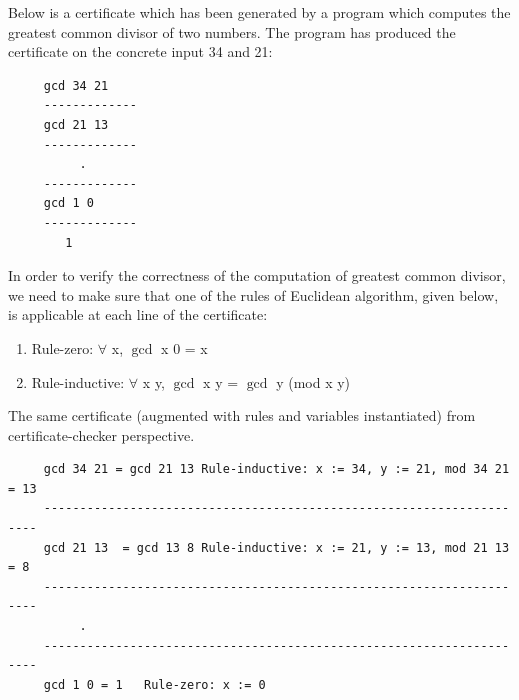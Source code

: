  
  
   \noindent 
    Below is a certificate which has been generated by a program which computes the greatest common divisor 
    of two numbers. The program has produced the certificate
    on the concrete input 34 and 21:
    \begin{center}
  
   \begin{verbatim}
     gcd 34 21
     -------------
     gcd 21 13
     -------------
          .
     -------------
     gcd 1 0 
     -------------
        1
   \end{verbatim}
    \end{center}
   
   
   In order to verify the correctness of the computation of greatest common divisor, we need to 
    make sure that one of the rules of Euclidean algorithm, given below, is applicable at 
    each line of the certificate:
   \begin{enumerate}
   \item Rule-zero: $\forall$ x, $\gcd$ x 0 = x
   \item Rule-inductive: $\forall$ x y, $\gcd$ x y = $\gcd$ y (mod x y)
   \end{enumerate}

 \noindent	
  The same certificate (augmented with rules and variables instantiated) from certificate-checker perspective.
    \begin{verbatim}
     gcd 34 21 = gcd 21 13 Rule-inductive: x := 34, y := 21, mod 34 21 = 13
     ---------------------------------------------------------------------
     gcd 21 13  = gcd 13 8 Rule-inductive: x := 21, y := 13, mod 21 13 = 8
     ---------------------------------------------------------------------
          .
     ---------------------------------------------------------------------
     gcd 1 0 = 1   Rule-zero: x := 0 
   \end{verbatim}
   
